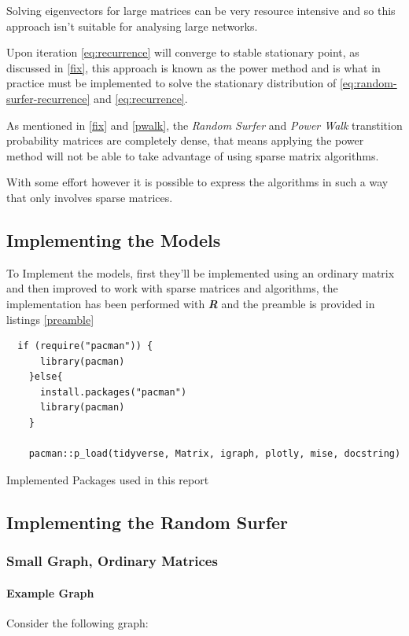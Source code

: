 \documentclass[11pt]{article}
\begin{document}
Solving eigenvectors for large matrices can be very resource intensive and so
this approach isn't suitable for analysing large networks.

Upon iteration \eqref{eq:recurrence} will converge to stable stationary point, as discussed
in \ref{fix}, this approach is known as the power method
\cite{larsonElementaryLinearAlgebra1991a} and is what in practice must be
implemented to solve the stationary distribution of
\eqref{eq:random-surfer-recurrence} and \eqref{eq:recurrence}.


As mentioned in \ref{fix} and \ref{pwalk}, the \emph{Random Surfer} and \emph{Power Walk}
transtition probability matrices are completely dense, that means applying the
power method will not be able to take advantage of using sparse matrix
algorithms.

With some effort however it is possible to express the algorithms in such a way that only involves sparse matrices.

\subsection{Implementing the Models}
\label{sec:orgfb5562c}
To Implement the models, first they'll be implemented using an ordinary matrix and then improved to work with sparse matrices and algorithms, the implementation has been performed with \emph{\textbf{R}} and the preamble is provided in listings \ref{preamble}

\begin{listing}[htbp]
\begin{verbatim}
  if (require("pacman")) {
      library(pacman)
    }else{
      install.packages("pacman")
      library(pacman)
    }

    pacman::p_load(tidyverse, Matrix, igraph, plotly, mise, docstring)
\end{verbatim}
\caption{\label{preamble}Implemented Packages used in this report}
\end{listing}

\subsection{Implementing the Random Surfer}
\label{sec:org454ff50}
\subsubsection{Small Graph, Ordinary Matrices}
\label{implementing-page-rank-methods}
\paragraph{Example Graph}
\label{example-graph}
Consider the following graph:
\end{document}
